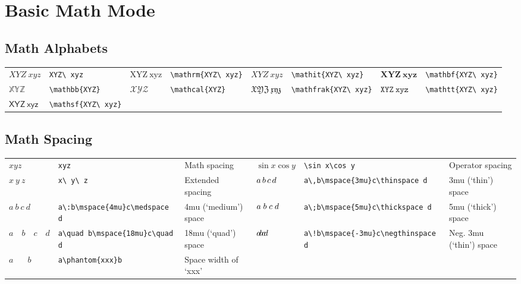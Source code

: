 \documentclass[10pt, english]{article}
\begin{document}
\section{Basic Math Mode}

	\subsection{Math Alphabets}

	\begin{center}
		\scriptsize
	\begin{tabular}{ll|ll|ll|ll}
		$XYZ\ xyz$ & \verb|XYZ\ xyz| & $\mathrm{XYZ\ xyz}$ & \verb|\mathrm{XYZ\ xyz}| & $\mathit{XYZ\ xyz}$ & \verb|\mathit{XYZ\ xyz}| & $\mathbf{XYZ\ xyz}$ & \verb|\mathbf{XYZ\ xyz}|\\
		$\mathbb{XYZ}$ & \verb|\mathbb{XYZ}| & $\mathcal{XYZ}$ & \verb|\mathcal{XYZ}| & $\mathfrak{XYZ\ xyz}$ & \verb|\mathfrak{XYZ\ xyz}| & $\mathtt{XYZ\ xyz}$ & \verb|\mathtt{XYZ\ xyz}|\\
		$\mathsf{XYZ\ xyz}$ & \verb|\mathsf{XYZ\ xyz}|
	\end{tabular}
	\end{center}

	\subsection{Math Spacing}

	\begin{center}
		\scriptsize
	\begin{tabular}{lll|lll}
		$xyz$ & \verb|xyz| & Math spacing & $\sin x\cos y$ & \verb|\sin x\cos y| & Operator spacing\\
		$x\ y\ z$ & \verb|x\ y\ z| & Extended spacing & $a\,b\mspace{3mu}c\thinspace d$ & \verb|a\,b\mspace{3mu}c\thinspace d| & 3mu (`thin') space\\
		$a\:b\mspace{4mu}c\medspace d$ & \verb|a\:b\mspace{4mu}c\medspace d| & 4mu (`medium') space & $a\;b\mspace{5mu}c\thickspace d$ & \verb|a\;b\mspace{5mu}c\thickspace d| & 5mu (`thick') space\\
		$a\quad b\mspace{18mu}c\quad d$ & \verb|a\quad b\mspace{18mu}c\quad d| & 18mu (`quad') space & $a\!b\mspace{-3mu}c\negthinspace d$ & \verb|a\!b\mspace{-3mu}c\negthinspace d| & Neg. 3mu (`thin') space\\
		$a\phantom{xxx}b$ & \verb|a\phantom{xxx}b| & Space width of `xxx'\\
	\end{tabular}
	\end{center}
\end{document}
